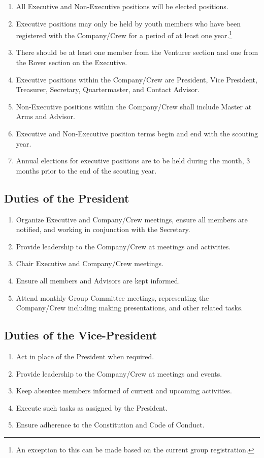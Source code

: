 \begin{enumerate}
    \item All Executive and Non-Executive positions will be elected positions.
    \item Executive positions may only be held by youth members who have been registered with the Company/Crew for a period of at least one year.\footnote{An exception to this can be made based on the current group registration.}
    \item There should be at least one member from the Venturer section and one from the Rover section on the Executive.\footnotemark[\value{footnote}]
    \item Executive positions within the Company/Crew are President, Vice President, Treasurer, Secretary, Quartermaster, and Contact Advisor.
    \item Non-Executive positions within the Company/Crew shall include Master at Arms and Advisor.
    \item Executive and Non-Executive position terms begin and end with the scouting year.
    \item Annual elections for executive positions are to be held during the month, 3 months prior to the end of the scouting year.
\end{enumerate}

\subsection{Duties of the President}\label{subsec:duties-of-the-president}
\begin{enumerate}
    \item Organize Executive and Company/Crew meetings, ensure all members are notified, and working in conjunction with the Secretary.
    \item Provide leadership to the Company/Crew at meetings and activities.
    \item Chair Executive and Company/Crew meetings.
    \item Ensure all members and Advisors are kept informed.
    \item Attend monthly Group Committee meetings, representing the Company/Crew including making presentations, and other related tasks.
\end{enumerate}

\subsection{Duties of the Vice-President}\label{subsec:duties-of-the-vice-president}
\begin{enumerate}
    \item Act in place of the President when required.
    \item Provide leadership to the Company/Crew at meetings and events.
    \item Keep absentee members informed of current and upcoming activities.
    \item Execute such tasks as assigned by the President.
    \item Ensure adherence to the Constitution and Code of Conduct.
\end{enumerate}

